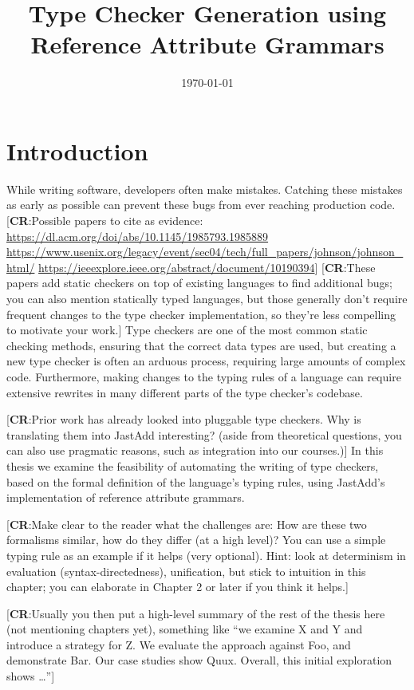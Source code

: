 \documentclass[nofilelist]{cslthse-msc}
\title{Type Checker Generation using Reference Attribute Grammars}
\date{\today}
\newcommand{\CR}[1]{\textcolor{green!60!black}{[\textbf{CR}:#1]}}
\begin{document}
\renewcommand{\bibname}{References}

\makefrontmatter
\chapter{Introduction} %
While writing software, developers often make mistakes.
Catching these mistakes as early as possible can prevent these bugs from ever reaching production code.
\CR{Possible papers to cite as evidence:
  \url{https://dl.acm.org/doi/abs/10.1145/1985793.1985889}
  \url{https://www.usenix.org/legacy/event/sec04/tech/full_papers/johnson/johnson_html/}
  \url{https://ieeexplore.ieee.org/abstract/document/10190394}}
\CR{These papers add static checkers on top of existing languages to find additional bugs; you can also
  mention statically typed languages, but those generally don't require frequent changes to the type checker implementation, so they're less
  compelling to motivate your work.}
Type checkers are one of the most common static checking methods, ensuring that the correct data types are used, but creating a new type checker is often an arduous process, requiring large amounts of complex code.
Furthermore, making changes to the typing rules of a language can require extensive rewrites in many different parts of the type checker's codebase.

\CR{Prior work has already looked into pluggable type checkers.
  Why is translating them into JastAdd interesting?
  (aside from theoretical questions, you can also use
  pragmatic reasons, such as integration into our courses.)}
In this thesis we examine the feasibility of automating the writing of type checkers, based on the formal definition of the language's typing rules, using JastAdd's implementation of reference attribute grammars.

\CR{Make clear to the reader what the challenges are:
   How are these two formalisms similar, how do they differ (at a high level)?
   You can use a simple typing rule as an example if it helps (very optional).
   Hint: look at determinism in evaluation (syntax-directedness), unification,
   but stick to intuition in this chapter; you can elaborate in Chapter 2 or later
   if you think it helps.}

\CR{Usually you then put a high-level summary of the rest of the thesis here (not mentioning
  chapters yet), something like ``we examine X and Y and introduce a strategy for Z.
  We evaluate the approach against Foo, and demonstrate Bar.
  Our case studies show Quux.
  Overall, this initial exploration shows \ldots''}
\end{document}
